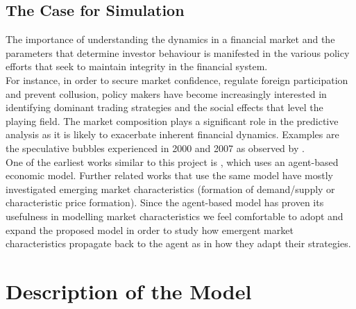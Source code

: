 \documentclass[11pt]{article}
\begin{document}
\subsection{The Case for Simulation}
The importance of understanding the dynamics in a financial market and the parameters that determine investor behaviour is manifested in the various policy efforts that seek to maintain integrity in the financial system.\\
For instance, in order to secure market confidence, regulate foreign participation and prevent collusion, policy makers have become increasingly interested in identifying dominant trading strategies and the social effects that level the playing field. The market composition plays a significant role in the predictive analysis as it is likely to exacerbate inherent financial dynamics. Examples are the speculative bubbles experienced in 2000 and 2007 as observed by \citet{kaisoji2015super}. \\
One of the earliest works similar to this project is \citet{de1990noise}, which uses an agent-based economic model. Further related works that use the same model have mostly investigated emerging market characteristics (formation of demand/supply or characteristic price formation). Since the agent-based model has proven its usefulness in modelling market characteristics we feel comfortable to adopt and expand the proposed model in order to study how emergent market characteristics propagate back to the agent as in how they adapt their strategies.

\section{Description of the Model}
\end{document}
